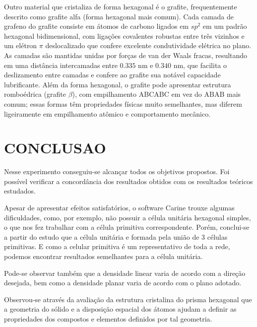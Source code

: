 \documentclass[10pt,twocolumn,letterpaper]{article}
\begin{document}
\hspace{1cm} Outro material que cristaliza de forma hexagonal é o grafite, frequentemente descrito como grafite alfa (forma hexagonal mais comum). Cada camada de grafeno do grafite consiste em átomos de carbono ligados em $sp^2$ em um padrão hexagonal bidimensional, com ligações covalentes robustas entre três vizinhos e um elétron $\pi$ deslocalizado que confere excelente condutividade elétrica no plano. As camadas são mantidas unidas por forças de van der Waals fracas, resultando em uma distância intercamadas entre $0.335$ nm e $0.340$ nm, que facilita o deslizamento entre camadas e confere ao grafite sua notável capacidade lubrificante. Além da forma hexagonal, o grafite pode apresentar estrutura romboédrica (grafite $\beta$), com empilhamento ABCABC em vez do ABAB mais comum; essas formas têm propriedades físicas muito semelhantes, mas diferem ligeiramente em empilhamento atômico e comportamento mecânico.


\section{CONCLUSAO}

\hspace{1cm} Nesse experimento conseguiu-se alcançar todos os objetivos propostos. Foi possível verificar a concordância dos resultados obtidos com os resultados teóricos estudados.

\hspace{1cm} Apesar de apresentar efeitos satisfatórios, o software Carine trouxe algumas dificuldades, como, por exemplo, não possuir a célula unitária hexagonal simples, o que nos fez trabalhar com a célula primitiva correspondente. Porém, conclui-se a partir do estudo que a célula unitária e formada pela união de 3 células primitivas. E como a celular primitiva é um representativo de toda a rede, podemos encontrar resultados semelhantes para a célula unitária.

\hspace{1cm} Pode-se observar também que a densidade linear varia de acordo com a direção desejada, bem como a densidade planar varia de acordo com o plano adotado.

\hspace{1cm}Observou-se através da avaliação da estrutura cristalina do prisma hexagonal que a geometria do sólido e a disposição espacial dos átomos ajudam a definir as propriedades dos compostos e elementos definidos por tal geometria. 
\end{document}

